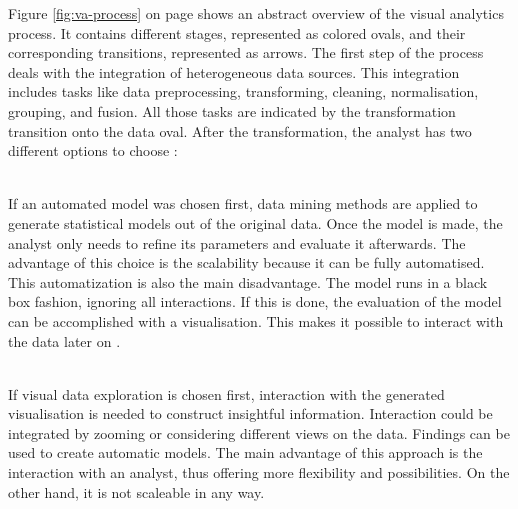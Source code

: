 Figure \ref{fig:va-process} on page \pageref{fig:va-process} shows an abstract overview of the visual analytics process. It contains different stages, represented as colored ovals, and their corresponding transitions, represented as arrows. The first step of the process deals with the integration of heterogeneous data sources. This integration includes tasks like data preprocessing, transforming, cleaning, normalisation, grouping, and fusion. All those tasks are indicated by the transformation transition onto the data oval. After the transformation, the analyst has two different options to choose :

\begin{enumerate}
 \hfill \\
If an automated model was chosen first, data mining methods are applied to generate statistical models out of the original data. Once the model is made, the analyst only needs to refine its parameters and evaluate it afterwards. The advantage of this choice is the scalability because it can be fully automatised. This automatization is also the main disadvantage. The model runs in a black box fashion, ignoring all interactions. If this is done, the evaluation of the model can be accomplished with a visualisation. This makes it possible to interact with the data later on .

 \hfill \\
If visual data exploration is chosen first, interaction with the generated visualisation is needed to construct insightful information. Interaction could be integrated by zooming or considering different views on the data. Findings can be used to create automatic models. The main advantage of this approach is the interaction with an analyst, thus offering more flexibility and possibilities. On the other hand, it is not scaleable in any way.
\end{enumerate}

